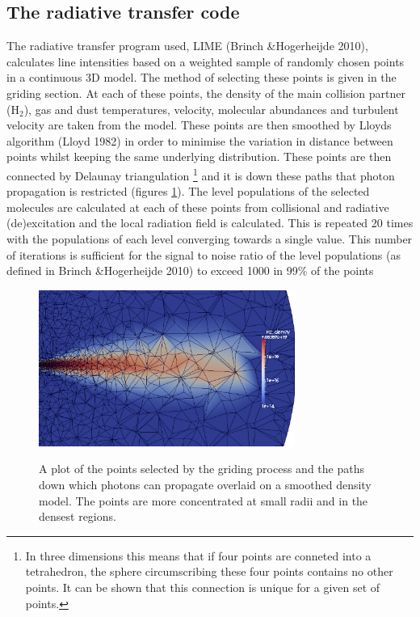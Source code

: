 \documentclass[useAMS,usenatbib]{mn2e}
\begin{document}
\subsection{The radiative transfer code} \label{subsec:radiative_transfer_code}
The radiative transfer program used, LIME (Brinch \&Hogerheijde 2010), calculates line intensities based on a weighted sample of randomly chosen points in a continuous 3D model. The method of selecting these points is given in the griding section. At each of these points, the density of the main collision partner (H$_2$), gas and dust temperatures, velocity, molecular abundances and turbulent velocity are taken from the model. These points are then smoothed by Lloyds algorithm (Lloyd 1982) in order to minimise the variation in distance between points whilst keeping the same underlying distribution. These points are then connected by Delaunay triangulation \footnote{In three dimensions this means that if four points are conneted into a tetrahedron, the sphere circumscribing these four points contains no other points. It can be shown that this connection is unique for a given set of points.} and it is down these paths that photon propagation is restricted (figures \ref{grid}). The level populations of the selected molecules are calculated at each of these points from collisional and radiative (de)excitation and the local radiation field is calculated. This is repeated 20 times with the populations of each level converging towards a single value. This number of iterations is sufficient for the signal to noise ratio of the level populations (as defined in Brinch \&Hogerheijde 2010) to exceed 1000 in 99\% of the points \newline


\begin{figure}
 \includegraphics[width=84mm]{Figures/model/Lime_grid3.png}
 \label{grid}
 \caption{A plot of the points selected by the griding process and the paths down which photons can propagate overlaid on a smoothed density model. The points are more concentrated at small radii and in the densest regions.}
\end{figure}
\end{document}
